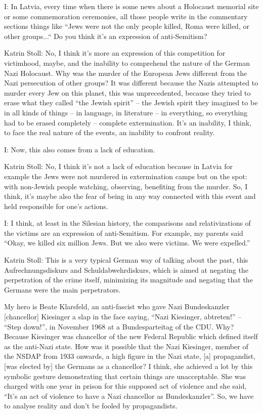  

I: In Latvia, every time when there is some news about a Holocaust memorial site or some commemoration ceremonies, all those people write in the commentary sections things like “Jews were not the only people killed, Roma were killed, or other groups...“ Do you think it’s an expression of anti-Semitism? 

 

Katrin Stoll: No, I think it’s more an expression of this competition for victimhood, maybe, and the inability to comprehend the nature of the German Nazi Holocaust. Why was the murder of the European Jews different from the Nazi persecution of other groups? It was different because the Nazis attempted to murder every Jew on this planet, this was unprecedented, because they tried to erase what they called “the Jewish spirit” – the Jewish spirit they imagined to be in all kinds of things – in language, in literature – in everything, so everything had to be erased completely – complete extermination. It’s an inability, I think, to face the real nature of the events, an inability to confront reality. 

 

I: Now, this also comes from a lack of education. 

 

Katrin Stoll: No, I think it’s not a lack of education because in Latvia for example the Jews were not murdered in extermination camps but on the spot: with non-Jewish people watching, observing, benefiting from the murder. So, I think, it’s maybe also the fear of being in any way connected with this event and held responsible for one’s actions. 

 

I: I think, at least in the Silesian history, the comparisons and relativizations of the victims are an expression of anti-Semitism. For example, my parents said “Okay, we killed six million Jews. But we also were victims. We were expelled.”  

 
Katrin Stoll: This is a very typical German way of talking about the past, this Aufrechnungsdiskurs and Schuldabwehrdiskurs, which is aimed at negating the perpetration of the crime itself, minimizing its magnitude and negating that the Germans were the main perpetrators.  

 

My hero is Beate Klarsfeld, an anti-fascist who gave Nazi Bundeskanzler [chancellor] Kiesinger a slap in the face saying, “Nazi Kiesinger, abtreten!” – “Step down!”, in November 1968 at a Bundesparteitag of the CDU. Why? Because Kiesinger was chancellor of the new Federal Republic which defined itself as the anti-Nazi state. How was it possible that the Nazi Kiesinger, member of the NSDAP from 1933 onwards, a high figure in the Nazi state, [a] propagandist, [was elected by] the Germans as a chancellor?  I think, she achieved a lot by this symbolic gesture demonstrating that certain things are unacceptable. She was charged with one year in prison for this supposed act of violence and she said, “It’s an act of violence to have a Nazi chancellor as Bundeskanzler”. So, we have to analyse reality and don’t be fooled by propagandists.  